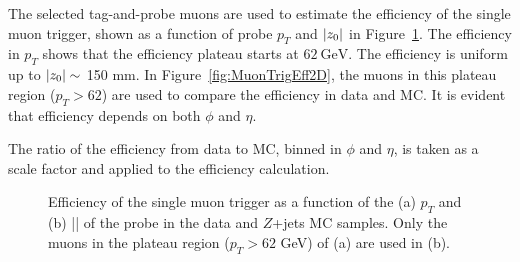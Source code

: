 The selected tag-and-probe muons are used to estimate the efficiency of the single muon trigger, shown as a function of probe $p_{T}$ and $|z_{0}|$ in Figure~\ref{fig:MuonTrigEff1D}. The efficiency in $p_{T}$ shows that the efficiency plateau starts at $62~\si{\GeV}$. The efficiency is uniform up to $|z_{0}|\sim$ 150 mm. In Figure~\ref{fig:MuonTrigEff2D}, the muons in this plateau region ($p_{T} > 62$) are used to compare the efficiency in data and MC. It is evident that efficiency depends on both $\phi$ and $\eta$. 

The ratio of the efficiency from data to MC, binned in $\phi$ and $\eta$, is taken as a scale factor and applied to the efficiency calculation.


\begin{figure}[!htb]
    \centering
    \caption{Efficiency of the single muon trigger as a function of the (a) $p_{T}$ and (b) |\zzero| of the probe in the data and $Z$+jets MC samples. Only the muons in the plateau region ($p_{T} > 62$ GeV) of (a) are used in (b).}
    \label{fig:MuonTrigEff1D}
\end{figure}


